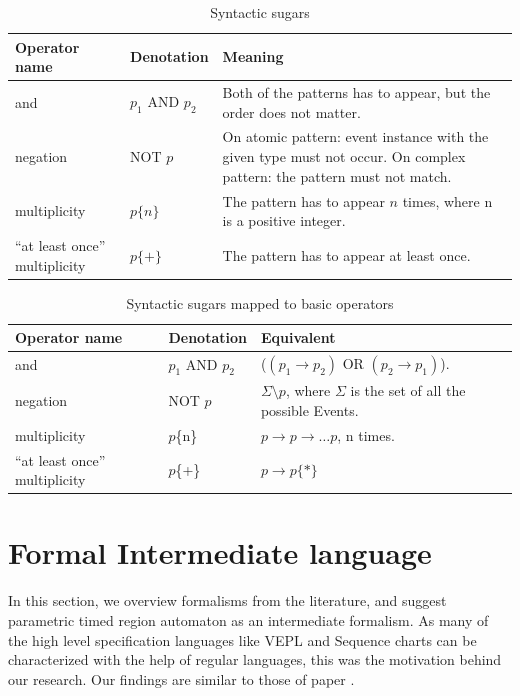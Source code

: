 		\begin{table}
		\caption{Syntactic sugars}		
		\label{tab:cep:veplsugar}
		\begin{tabularx}{\textwidth}{llX}
				\toprule
				Operator name &	Denotation & Meaning \\
				\midrule
				and & $p_1$ AND $p_2$ & Both of the patterns has to appear, but the order does not matter.\\
				negation & NOT $p$ & On atomic pattern: event instance with the given type must not occur. On complex pattern: the pattern must not match. \\
				multiplicity & $p\{n\}$ & The pattern has to appear $n$ times, where n is a positive integer.\\
				``at least once'' multiplicity & $p\{+\}$ & The pattern has to appear at least once. \\
				\bottomrule
			\end{tabularx}
		\end{table}
		
		\begin{table}
			\caption{Syntactic sugars mapped to basic operators}		
			\label{tab:cep:veplsugartobasic}
			\begin{tabularx}{\textwidth}{llX}
				\toprule
				Operator name & Denotation & Equivalent \\
				\midrule
				and & $p_1$ AND $p_2$ & ($(p_1 \rightarrow p_2)$ OR $(p_2 \rightarrow p_1)$). \\
				negation & NOT $p$ & $\Sigma \setminus p$, where $\Sigma$ is the set of all the possible Events. \\
				multiplicity & $p$\{n\} & $p \rightarrow p \rightarrow \dots p$, n times. \\
				``at least once'' multiplicity & $p$\{+\} & $p \rightarrow p\{\ast\}$ \\
				\bottomrule
			\end{tabularx}
		\end{table}

		
	\section{Formal Intermediate language}
		
		In this section, we overview formalisms from the literature, and suggest parametric timed region automaton as an intermediate formalism.
		As many of the high level specification languages like VEPL and Sequence charts can be characterized with the help of regular languages,
		this was the motivation behind our research. Our findings are similar to those of paper \cite{dicep}.
		
